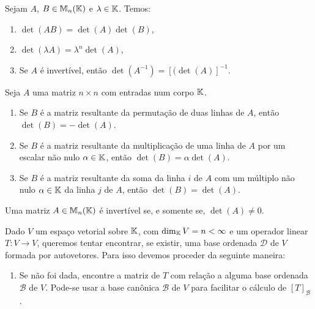 \documentclass{beamer}
\begin{document}
    \begin{frame}
        \begin{proposicao}
            Sejam $A$, $B \in \mathbb{M}_n(\mathbb{K})$ e $\lambda \in \mathbb{K}$. Temos:
            \begin{enumerate}[label={\roman*})]
                \item $\det(AB) = \det(A) \det(B)$,
                \item $\det(\lambda A) = \lambda^n \det(A)$,
                \item Se $A$ é invertível, então $\det(A^{-1}) = [(\det(A)]^{-1}$.
            \end{enumerate}
        \end{proposicao}
    \end{frame}

    \begin{frame}
        \begin{proposicao}
            Seja $A$ uma matriz $n \times n$ com entradas num corpo $\mathbb{K}$.
            \begin{enumerate}[label={\roman*})]
                \item Se $B$ é a matriz resultante da permutação de duas linhas de $A$, então $\det (B) = -\det (A)$.
                \item Se $B$ é a matriz resultante da multiplicação de uma linha de $A$ por um escalar não nulo $\alpha \in \mathbb{K}$, então $\det(B) = \alpha\det(A)$.
                \item Se $B$ é a matriz resultante da soma da linha $i$ de $A$ com um múltiplo não nulo $\alpha \in \mathbb{K}$ da linha $j$ de $A$, então $\det(B) = \det(A)$.
            \end{enumerate}
        \end{proposicao}
    \end{frame}

    \begin{frame}
        \begin{teorema}
            Uma matriz $A \in \mathbb{M}_n(\mathbb{K})$ é invertível se, e somente se, $\det(A) \ne 0$.
        \end{teorema}
    \end{frame}

    \begin{frame}
        Dado $V$ um espaço vetorial sobre $\mathbb{K}$, com $\dim_{\mathbb{K}} V = n < \infty$ e um operador linear $T \colon V \to V$, queremos tentar encontrar, se existir, uma base ordenada $\mathcal{D}$ de $V$ formada por autovetores. Para isso devemos proceder da seguinte maneira:
        \begin{enumerate}[label={\arabic*})]
            \item Se não foi dada, encontre a matriz de $T$ com relação a alguma base ordenada $\mathcal{B}$ de $V$. Pode-se usar a base canônica $\mathcal{B}$ de $V$ para facilitar o cálculo de $[T]_\mathcal{B}$.
            \seti
        \end{enumerate}
    \end{frame}
\end{document}
